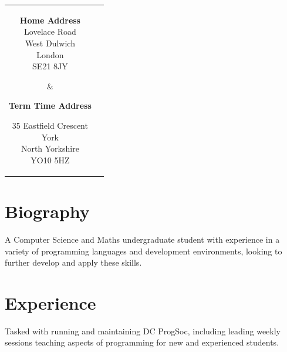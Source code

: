 \documentclass[a4paper]{cv}
\begin{document}
\begin{minipage}[t]{0.66\textwidth} %

\begin{tabular}{c  c}
\parbox{0.33\textwidth}{
\center\textbf{Home Address} \\
\sectionspace
{} Lovelace Road \\
West Dulwich \\
London \\
SE21 8JY}
& 
\parbox{0.33\textwidth}{
\center\textbf{Term Time Address} \\
\sectionspace
\raggedright
35 Eastfield Crescent \\
York \\
North Yorkshire \\
YO10 5HZ}
\end{tabular}

\sectionspace %

\section{Biography}

A Computer Science and Maths undergraduate student with experience in a variety of programming languages and development environments, looking to further develop and apply these skills.

\sectionspace


\section{Experience}


\vspace{\topsep} %
\begin{tightitemize}
\item Tasked with running and maintaining DC ProgSoc, including leading weekly sessions teaching aspects of programming for new and experienced students.
\end{tightitemize}


\end{minipage}
\end{document}
